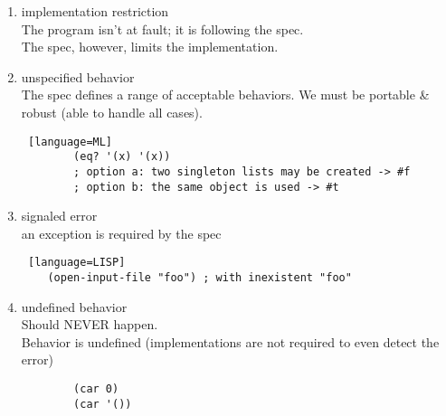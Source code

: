 \documentclass[../../lecture_notes.tex]{subfiles}
\begin{document}
\begin{enumerate} [itemsep=0mm]
	\item implementation restriction\\
		The program isn’t at fault; it is following the spec.\\
		The spec, however, limits the implementation.
	\item unspecified behavior\\
		The spec defines a range of acceptable behaviors.
		We must be portable \& robust (able to handle all cases).\\
		\begin{lstlisting} [language=ML]
		(eq? '(x) '(x))
		; option a: two singleton lists may be created -> #f
		; option b: the same object is used -> #t
	\end{lstlisting}
	\item signaled error\\
		an exception is required by the spec
		\begin{lstlisting} [language=LISP]
	(open-input-file "foo") ; with inexistent "foo"
		\end{lstlisting}
	\item undefined behavior\\
		Should NEVER happen.\\
		Behavior is undefined (implementations are not required to even detect the error)
		\begin{lstlisting}
		(car 0)
		(car '())
		\end{lstlisting}
\end{enumerate}
\end{document}
